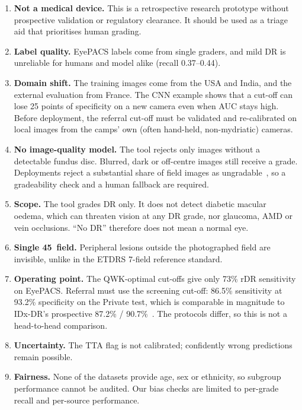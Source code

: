 \documentclass[conference,a4paper]{IEEEtran}
\begin{document}
\begin{enumerate}
\item \textbf{Not a medical device.} This is a retrospective research prototype without prospective validation or regulatory clearance. It should be used as a triage aid that prioritises human grading.
\item \textbf{Label quality.} EyePACS labels come from single graders, and mild DR is unreliable for humans and model alike (recall 0.37--0.44).
\item \textbf{Domain shift.} The training images come from the USA and India, and the external evaluation from France. The CNN example shows that a cut-off can lose 25 points of specificity on a new camera even when AUC stays high. Before deployment, the referral cut-off must be validated and re-calibrated on local images from the camps' own (often hand-held, non-mydriatic) cameras.
\item \textbf{No image-quality model.} The tool rejects only images without a detectable fundus disc. Blurred, dark or off-centre images still receive a grade. Deployments reject a substantial share of field images as ungradable~\cite{beede}, so a gradeability check and a human fallback are required.
\item \textbf{Scope.} The tool grades DR only. It does not detect diabetic macular oedema, which can threaten vision at any DR grade, nor glaucoma, AMD or vein occlusions. ``No DR'' therefore does not mean a normal eye.
\item \textbf{Single 45\textdegree\ field.} Peripheral lesions outside the photographed field are invisible, unlike in the ETDRS 7-field reference standard.
\item \textbf{Operating point.} The QWK-optimal cut-offs give only 73\% rDR sensitivity on EyePACS. Referral must use the screening cut-off: 86.5\% sensitivity at 93.2\% specificity on the Private test, which is comparable in magnitude to IDx-DR's prospective 87.2\% / 90.7\%~\cite{abramoff}. The protocols differ, so this is not a head-to-head comparison.
\item \textbf{Uncertainty.} The TTA flag is not calibrated; confidently wrong predictions remain possible.
\item \textbf{Fairness.} None of the datasets provide age, sex or ethnicity, so subgroup performance cannot be audited. Our bias checks are limited to per-grade recall and per-source performance.
\end{enumerate}
\end{document}
